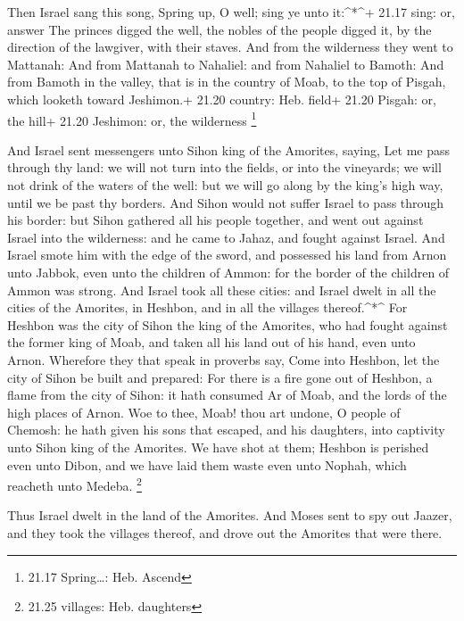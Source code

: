  Then Israel sang this song, Spring up, O well; sing ye
unto it:\^{}*\^{}+ 21.17 sing: or, answer  The princes
digged the well, the nobles of the people digged it, by the direction of
the lawgiver, with their staves. And from the wilderness they went to
Mattanah:  And from Mattanah to Nahaliel: and from Nahaliel
to Bamoth:  And from Bamoth in the valley, that is in the
country of Moab, to the top of Pisgah, which looketh toward Jeshimon.+
21.20 country: Heb. field+ 21.20 Pisgah: or, the hill+ 21.20 Jeshimon:
or, the wilderness \footnote{21.17 Spring\ldots: Heb. Ascend}

 And Israel sent messengers unto Sihon king of the
Amorites, saying,  Let me pass through thy land: we will
not turn into the fields, or into the vineyards; we will not drink of
the waters of the well: but we will go along by the king's high way,
until we be past thy borders.  And Sihon would not suffer
Israel to pass through his border: but Sihon gathered all his people
together, and went out against Israel into the wilderness: and he came
to Jahaz, and fought against Israel.  And Israel smote him
with the edge of the sword, and possessed his land from Arnon unto
Jabbok, even unto the children of Ammon: for the border of the children
of Ammon was strong.  And Israel took all these cities: and
Israel dwelt in all the cities of the Amorites, in Heshbon, and in all
the villages thereof.\^{}*\^{}  For Heshbon was the city of
Sihon the king of the Amorites, who had fought against the former king
of Moab, and taken all his land out of his hand, even unto Arnon.
 Wherefore they that speak in proverbs say, Come into
Heshbon, let the city of Sihon be built and prepared:  For
there is a fire gone out of Heshbon, a flame from the city of Sihon: it
hath consumed Ar of Moab, and the lords of the high places of Arnon.
 Woe to thee, Moab! thou art undone, O people of Chemosh:
he hath given his sons that escaped, and his daughters, into captivity
unto Sihon king of the Amorites.  We have shot at them;
Heshbon is perished even unto Dibon, and we have laid them waste even
unto Nophah, which reacheth unto Medeba. \footnote{21.25 villages: Heb.
  daughters}

 Thus Israel dwelt in the land of the Amorites.
 And Moses sent to spy out Jaazer, and they took the
villages thereof, and drove out the Amorites that were there.


